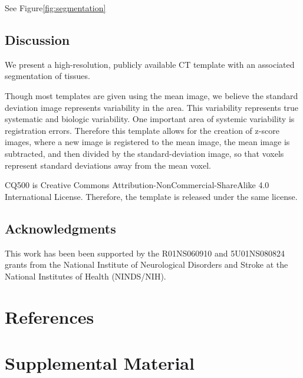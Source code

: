 \documentclass[]{elsarticle} %
\begin{document}
See Figure\ref{fig:segmentation}

\hypertarget{discussion}{%
\subsection{Discussion}\label{discussion}}

We present a high-resolution, publicly available CT template with an associated segmentation of tissues.

Though most templates are given using the mean image, we believe the standard deviation image represents variability in the area. This variability represents true systematic and biologic variability. One important area of systemic variability is registration errors. Therefore this template allows for the creation of z-score images, where a new image is registered to the mean image, the mean image is subtracted, and then divided by the standard-deviation image, so that voxels represent standard deviations away from the mean voxel.

CQ500 is Creative Commons Attribution-NonCommercial-ShareAlike 4.0 International License. Therefore, the template is released under the same license.

\hypertarget{acknowledgments}{%
\subsection{Acknowledgments}\label{acknowledgments}}

This work has been been supported by the R01NS060910 and 5U01NS080824 grants from the National Institute of Neurological Disorders and Stroke at the National Institutes of Health (NINDS/NIH).

\hypertarget{references}{%
\section*{References}\label{references}}

\hypertarget{supplemental-material}{%
\section{Supplemental Material}\label{supplemental-material}}
\end{document}

